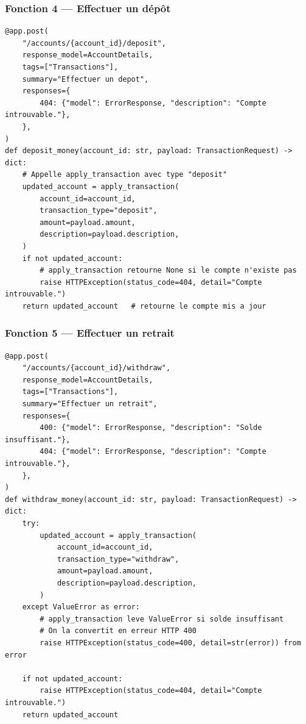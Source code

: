 \documentclass[12pt,a4paper]{article}
\begin{document}
\subsubsection{Fonction 4 — Effectuer un dépôt}

\begin{lstlisting}[style=python, caption={main.py — POST /accounts/\{account\_id\}/deposit}]
@app.post(
    "/accounts/{account_id}/deposit",
    response_model=AccountDetails,
    tags=["Transactions"],
    summary="Effectuer un depot",
    responses={
        404: {"model": ErrorResponse, "description": "Compte introuvable."},
    },
)
def deposit_money(account_id: str, payload: TransactionRequest) -> dict:
    # Appelle apply_transaction avec type "deposit"
    updated_account = apply_transaction(
        account_id=account_id,
        transaction_type="deposit",
        amount=payload.amount,
        description=payload.description,
    )
    if not updated_account:
        # apply_transaction retourne None si le compte n'existe pas
        raise HTTPException(status_code=404, detail="Compte introuvable.")
    return updated_account   # retourne le compte mis a jour
\end{lstlisting}

\subsubsection{Fonction 5 — Effectuer un retrait}

\begin{lstlisting}[style=python, caption={main.py — POST /accounts/\{account\_id\}/withdraw}]
@app.post(
    "/accounts/{account_id}/withdraw",
    response_model=AccountDetails,
    tags=["Transactions"],
    summary="Effectuer un retrait",
    responses={
        400: {"model": ErrorResponse, "description": "Solde insuffisant."},
        404: {"model": ErrorResponse, "description": "Compte introuvable."},
    },
)
def withdraw_money(account_id: str, payload: TransactionRequest) -> dict:
    try:
        updated_account = apply_transaction(
            account_id=account_id,
            transaction_type="withdraw",
            amount=payload.amount,
            description=payload.description,
        )
    except ValueError as error:
        # apply_transaction leve ValueError si solde insuffisant
        # On la convertit en erreur HTTP 400
        raise HTTPException(status_code=400, detail=str(error)) from error

    if not updated_account:
        raise HTTPException(status_code=404, detail="Compte introuvable.")
    return updated_account
\end{lstlisting}
\end{document}

